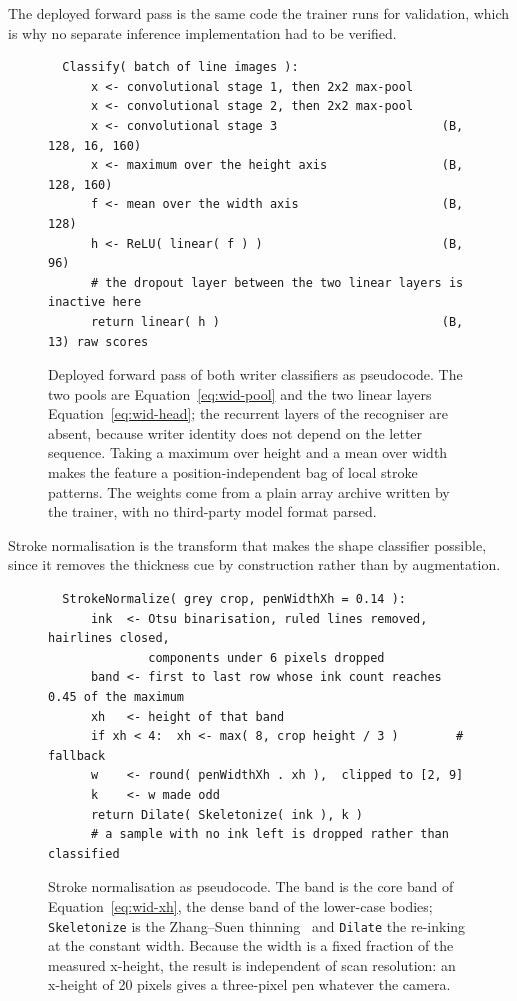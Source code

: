 The deployed forward pass is the same code the trainer runs for validation, which is why no separate inference implementation had to be verified.

\begin{figure}[!htbp]
\centering
\fontsize{8.5}{10.2}\selectfont
\begin{verbatim}
  Classify( batch of line images ):
      x <- convolutional stage 1, then 2x2 max-pool
      x <- convolutional stage 2, then 2x2 max-pool
      x <- convolutional stage 3                       (B, 128, 16, 160)
      x <- maximum over the height axis                (B, 128, 160)
      f <- mean over the width axis                    (B, 128)
      h <- ReLU( linear( f ) )                         (B, 96)
      # the dropout layer between the two linear layers is inactive here
      return linear( h )                               (B, 13) raw scores
\end{verbatim}
\caption{Deployed forward pass of both writer classifiers as pseudocode. The two pools are Equation~\ref{eq:wid-pool} and the two linear layers Equation~\ref{eq:wid-head}; the recurrent layers of the recogniser are absent, because writer identity does not depend on the letter sequence. Taking a maximum over height and a mean over width makes the feature a position-independent bag of local stroke patterns. The weights come from a plain array archive written by the trainer, with no third-party model format parsed.}
\label{fig:wid-forward}
\end{figure}

Stroke normalisation is the transform that makes the shape classifier possible, since it removes the thickness cue by construction rather than by augmentation.

\begin{figure}[!htbp]
\centering
\fontsize{8.5}{10.2}\selectfont
\begin{verbatim}
  StrokeNormalize( grey crop, penWidthXh = 0.14 ):
      ink  <- Otsu binarisation, ruled lines removed, hairlines closed,
              components under 6 pixels dropped
      band <- first to last row whose ink count reaches 0.45 of the maximum
      xh   <- height of that band
      if xh < 4:  xh <- max( 8, crop height / 3 )        # fallback
      w    <- round( penWidthXh . xh ),  clipped to [2, 9]
      k    <- w made odd
      return Dilate( Skeletonize( ink ), k )
      # a sample with no ink left is dropped rather than classified
\end{verbatim}
\caption{Stroke normalisation as pseudocode. The band is the core band of Equation~\ref{eq:wid-xh}, the dense band of the lower-case bodies; \texttt{Skeletonize} is the Zhang--Suen thinning~\cite{zhang1984} and \texttt{Dilate} the re-inking at the constant width. Because the width is a fixed fraction of the measured x-height, the result is independent of scan resolution: an x-height of 20 pixels gives a three-pixel pen whatever the camera.}
\label{fig:wid-snorm}
\end{figure}
